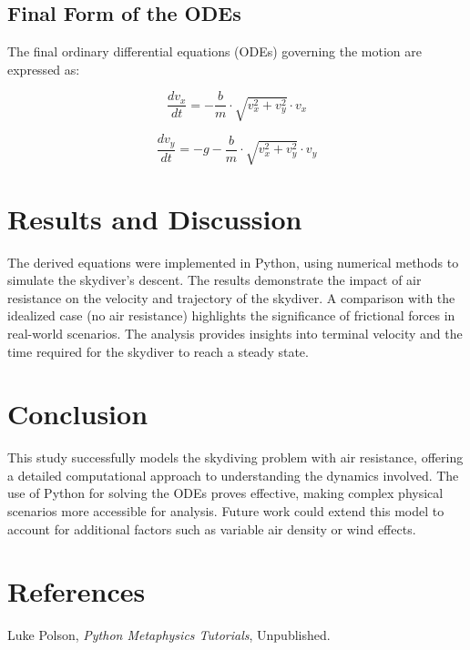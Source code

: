 \documentclass{article}
\begin{document}
\subsection*{Final Form of the ODEs}

The final ordinary differential equations (ODEs) governing the motion are expressed as:

\[
\frac{dv_{x}}{dt} = -\frac{b}{m} \cdot \sqrt{v_{x}^2 + v_{y}^2} \cdot v_{x}
\]

\[
\frac{dv_{y}}{dt} = -g - \frac{b}{m} \cdot \sqrt{v_{x}^2 + v_{y}^2} \cdot v_{y}
\]

\section*{Results and Discussion}

The derived equations were implemented in Python, using numerical methods to simulate the skydiver's descent. The results demonstrate the impact of air resistance on the velocity and trajectory of the skydiver. A comparison with the idealized case (no air resistance) highlights the significance of frictional forces in real-world scenarios. The analysis provides insights into terminal velocity and the time required for the skydiver to reach a steady state.

\section*{Conclusion}

This study successfully models the skydiving problem with air resistance, offering a detailed computational approach to understanding the dynamics involved. The use of Python for solving the ODEs proves effective, making complex physical scenarios more accessible for analysis. Future work could extend this model to account for additional factors such as variable air density or wind effects.

\section*{References}

\begin{thebibliography}{9}

Luke Polson,
\textit{Python Metaphysics Tutorials},
Unpublished.
    
\end{thebibliography}
\end{document}
